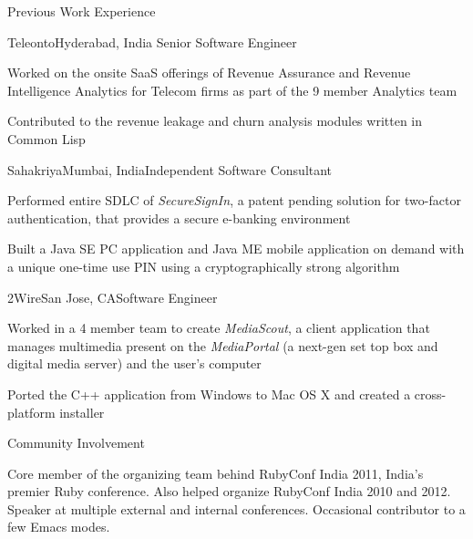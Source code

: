 \documentclass{resume} %
\begin{document}
\begin{rSection}{Previous Work Experience}

\begin{rSubsection}{Teleonto}{Hyderabad, India}{}{}
{Senior Software Engineer}
\item Worked on the onsite SaaS offerings of Revenue Assurance and Revenue Intelligence Analytics for Telecom firms as part of the 9 member Analytics team
\item Contributed to the revenue leakage and churn analysis modules written in Common Lisp
\end{rSubsection}


\begin{rSubsection}{Sahakriya}{Mumbai, India}{}{}{Independent Software Consultant}
\item Performed entire SDLC of {\em SecureSignIn}, a patent pending solution for two-factor authentication, that provides a secure e-banking environment
\item Built a Java SE PC application and Java ME mobile application on demand with a unique one-time use PIN using a cryptographically strong algorithm
\end{rSubsection}


\begin{rSubsection}{2Wire}{San Jose, CA}{}{}{Software Engineer}
\item Worked in a 4 member team to create {\em MediaScout}, a client
  application that manages multimedia present on the {\em MediaPortal}
  (a next-gen set top box and digital media server) and the user's computer
\item Ported the C++ application from Windows to Mac OS X and created a cross-platform installer
\end{rSubsection}

\end{rSection}


\begin{rSection}{Community Involvement}

Core member of the organizing team behind RubyConf India 2011, India's
premier Ruby conference. Also helped organize RubyConf India 2010 and
2012. Speaker at multiple external and internal conferences. Occasional
contributor to a few Emacs modes.
\end{rSection}
\end{document}

